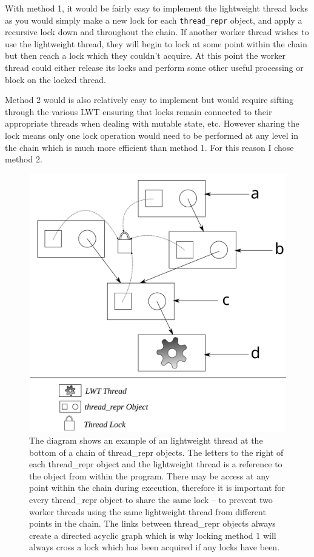 \documentclass[12pt,twoside,notitlepage]{report}
\begin{document}
With method 1, it would be fairly easy to implement the lightweight thread locks as you would simply make a new lock for each {\tt thread\_repr} object, and apply a recursive lock down and throughout the chain. If another worker thread
wishes to use the lightweight thread, they will begin to lock at some point within the chain but then reach a lock which they couldn't acquire. At this point the worker thread could either release its locks and perform some other
useful processing or block on the locked thread.

Method 2 would is also relatively easy to implement but would require sifting through the various LWT ensuring that locks remain connected to their appropriate threads when dealing with mutable state, etc. However sharing the lock
means only one lock operation would need to be performed at any level in the chain which is much more efficient than method 1. For this reason I chose method 2.

\begin{figure}[h!]
\includegraphics[width=\linewidth]{thread_repr}
\caption[Layered thread\_repr diagram]{The diagram shows an example of an lightweight thread at the bottom of a chain of thread\_repr objects. The letters to the right of each thread\_repr object and the lightweight thread is a reference to the object from within the program. There
may be access at any point within the chain during execution, therefore it is important for every thread\_repr object to share the same lock -- to prevent two worker threads using the same lightweight thread from different points in the
chain. The links between thread\_repr objects always create a directed acyclic graph which is why locking method 1 will always cross a lock which has been acquired if any locks have been.}
\label{fig:thread_repr}
\end{figure}
\end{document}
